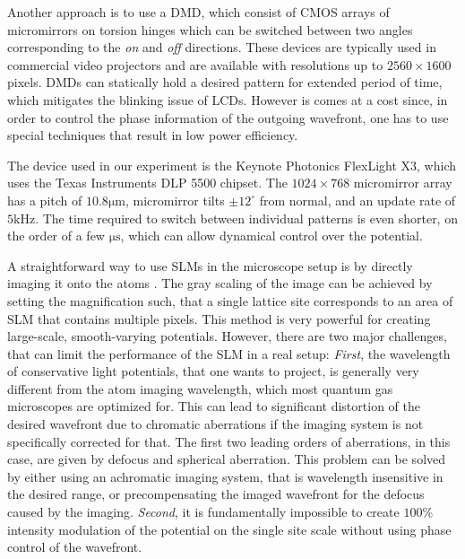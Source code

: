 Another approach is to use a DMD, which consist of CMOS arrays of micromirrors on torsion hinges which can be switched
between two angles corresponding to the \textit{on} and \textit{off} directions. These devices are typically used in commercial video projectors and are available with resolutions up to $2560 \times 1600$ pixels. DMDs can statically hold a desired pattern for extended period of time, which mitigates the blinking issue of LCDs. However is comes at a cost since, in order to control the phase information of the outgoing wavefront, one has to use special techniques\cite{Lee1970, Goorden2014} that result in low power efficiency. 

The device used in our experiment is the Keynote Photonics FlexLight X3, which uses the Texas Instruments DLP 5500 chipset. The $1024 \times 768$ micromirror array has a pitch of $10.8 \mathrm{\mu m}$, micromirror tilts $\pm 12^{\circ}$ from normal, and an update rate of $5 \mathrm{kHz}$. The time required to switch between individual patterns is even shorter, on the order of a few $\mathrm{\mu s}$, which can allow dynamical control over the potential.

A straightforward way to use SLMs in the microscope setup is by directly imaging it onto the atoms \cite{P. Schauß thesis, RMA thesis, MAZU thesis}. The gray scaling of the image can be achieved by setting the magnification such, that a single lattice site corresponds to an area of SLM that contains multiple pixels. This method is very powerful for creating large-scale, smooth-varying potentials. However, there are two major challenges, that can limit the performance of the SLM in a real setup: \textit{First}, the wavelength of conservative light potentials, that one wants to project, is generally very different from the atom imaging wavelength, which most quantum gas microscopes are optimized for. This can lead to significant distortion of the desired wavefront due to chromatic aberrations if the imaging system is not specifically corrected for that. The first two leading orders of aberrations, in this case, are given by defocus and spherical aberration. This problem can be solved by either using an achromatic imaging system, that is wavelength insensitive in the desired range, or precompensating the imaged wavefront for the defocus caused by the imaging. \textit{Second}, it is fundamentally impossible to create $100 \%$ intensity modulation of the potential on the single site scale without using phase control of the wavefront. 

